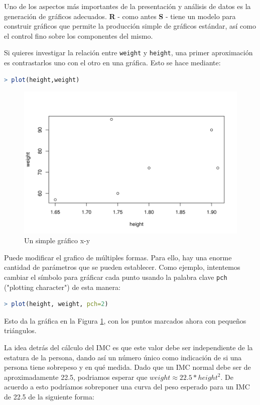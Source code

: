\documentclass[spanish]{extbook}
\numberwithin{equation}{section}
\numberwithin{figure}{section}
\begin{document}
Uno de los aspectos más importantes de la presentación y análisis de datos es
la generación de gráficos adecuados. \textbf{R} - como antes \textbf{S} - tiene un modelo
para construir gráficos que permite la producción simple de gráficos estándar,
así como el control fino sobre los componentes del mismo. 

Si quieres investigar la relación entre  \texttt{weight} y \texttt{height}, una
primer aproximación es contrastarlos uno con el otro en una gráfica. Esto se
hace mediante:

\begin{lstlisting}[language=R]
> plot(height,weight)
\end{lstlisting}

\begin{figure}[H]
  \includegraphics[width=\linewidth]{fig-2.png}
  \caption{Un simple gráfico x-y}
  \label{fig:fig-2}
\end{figure}

Puede modificar el grafico de múltiples formas. Para ello, hay una enorme
cantidad de parámetros que se pueden establecer. Como ejemplo, intentemos
cambiar el símbolo para gráficar cada punto usando la palabra clave
\texttt{pch} ("plotting character") de esta manera:

\begin{lstlisting}[language=R]
> plot(height, weight, pch=2)
\end{lstlisting}

Esto da la gráfica en la Figura \ref{fig:fig-2}, con los puntos marcados ahora
con pequeños triángulos.

La idea detrás del cálculo del IMC es que este valor debe ser independiente de
la estatura de la persona, dando así un número único como indicación de si una
persona tiene sobrepeso y en qué medida. Dado que un IMC normal debe ser de
aproximadamente 22.5, podriamos esperar que $weight \approx 22.5 * height^2$.
De acuerdo a esto podríamos sobreponer una curva del peso esperado para un IMC
de 22.5 de la siguiente forma:
\end{document}
